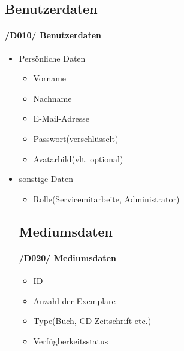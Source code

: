 \documentclass{article}
\begin{document}
\subsection{Benutzerdaten}
	\label{D010} \paragraph{/D010/ Benutzerdaten}
\begin{itemize}
    	\item Persönliche Daten
		\begin{itemize}
			\item Vorname
			\item Nachname
			\item E-Mail-Adresse
			\item Passwort(verschlüsselt)
			\item Avatarbild(vlt. optional)
		\end{itemize}	
		\item sonstige Daten
		\begin{itemize}
		    \item Rolle(Servicemitarbeite, Administrator) 
		\end{itemize}
	
	\subsection{Mediumsdaten}
	\label{D020} \paragraph{/D020/ Mediumsdaten}
	\begin{itemize}
	    \item ID
	    \item Anzahl der Exemplare
	    \item Type(Buch, CD Zeitschrift etc.)
	    \item Verfügberkeitsstatus
	    
	\end{itemize}
		

\end{itemize}
\end{document}
